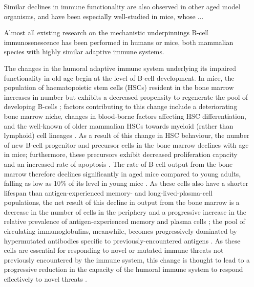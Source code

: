 Similar declines in immune functionality are also observed in other aged model organisms, and have been especially well-studied in mice, whose ...


Almost all existing research on the mechanistic underpinnings B-cell immunosenescence has been performed in humans or mice, both mammalian species with highly similar adaptive immune systems. 


The changes in the humoral adaptive immune system underlying its impaired functionality in old age begin at the level of B-cell development. In mice, the population of haematopoietic stem cells (HSCs) resident in the bone marrow increases in number but exhibits a decreased propensity to regenerate the pool of developing B-cells \parencite{ademokun2010ageing,kogut2012bcells}; factors contributing to this change include a deteriorating bone marrow niche, changes in blood-borne factors affecting HSC differentiation, and the well-known of older mammalian HSCs towards myeloid (rather than lymphoid) cell lineages \parencite{kogut2012bcells,dunnwalters2010bcellageing}. As a result of this change in HSC behaviour, the number of new B-cell progenitor and precursor cells in the bone marrow declines with age in mice; furthermore, these precursors exhibit decreased proliferation capacity and an increased rate of apoptosis \parencite{montecino2013immunosenescence,kogut2012bcells}. %
The rate of B-cell output from the bone marrow therefore declines significantly in aged mice compared to young adults, falling as low as 10\% of its level in young mice \parencite{kogut2012bcells}. As these \naive cells also have a shorter lifespan than antigen-experienced memory- and long-lived-plasma-cell populations, the net result of this decline in output from the bone marrow is a decrease in the number of \naive cells in the periphery and a progressive increase in the relative prevalence of antigen-experienced memory and plasma cells \parencite{mehr2011reversing,kogut2012bcells}; the pool of circulating immunoglobulins, meanwhile, becomes progressively dominated by hypermutated antibodies specific to previously-encountered antigens \parencite{kogut2012bcells}. As these \naive cells are essential for responding to novel or mutated immune threats not previously encountered by the immune system, this change is thought to lead to a progressive reduction in the capacity of the humoral immune system to respond effectively to novel threats \parencite{kogut2012bcells}.

